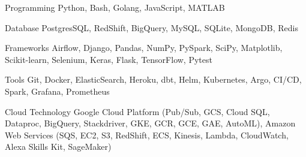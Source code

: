

\begin{cvskills}

  \cvskill
    {Programming} %
    {Python, Bash, Golang, JavaScript, MATLAB} %

  \cvskill
    {Database} %
    {PostgresSQL, RedShift, BigQuery, MySQL, SQLite, MongoDB, Redis} %


  \cvskill
    {Frameworks} %
    {Airflow, Django, Pandas, NumPy, PySpark, SciPy, Matplotlib, Scikit-learn, Selenium, Keras, Flask, TensorFlow, Pytest} %



  \cvskill
    {Tools} %
    {Git, Docker, ElasticSearch, Heroku, dbt, Helm, Kubernetes, Argo, CI/CD, Spark, Grafana, Prometheus} %

  \cvskill
    {Cloud Technology} %
    {Google Cloud Platform (Pub/Sub, GCS, Cloud SQL, Dataproc, BigQuery, Stackdriver, GKE, GCR, GCE, GAE, AutoML), Amazon Web Services (SQS, EC2, S3, RedShift, ECS, Kinesis, Lambda, CloudWatch, Alexa Skills Kit, SageMaker)} 




\end{cvskills}
